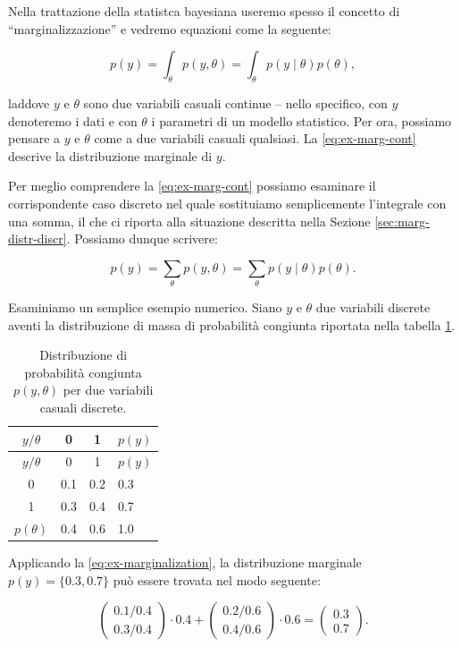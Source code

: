 \documentclass[
  11pt,
]{krantz}
\theoremstyle{definition}
\theoremstyle{definition}
\theoremstyle{definition}
\theoremstyle{definition}
\theoremstyle{remark}
\begin{document}
Nella trattazione della statistca bayesiana useremo spesso il concetto di ``marginalizzazione'' e vedremo equazioni come la seguente:

\begin{equation}
p(y) = \int_{\theta} p(y, \theta) = \int_{\theta} p(y \mid \theta) p(\theta),
\label{eq:ex-marg-cont}
\end{equation}

laddove \(y\) e \(\theta\) sono due variabili casuali continue -- nello specifico, con \(y\) denoteremo i dati e con \(\theta\) i parametri di un modello statistico. Per ora, possiamo pensare a \(y\) e \(\theta\) come a due variabili casuali qualsiasi. La \eqref{eq:ex-marg-cont} descrive la distribuzione marginale di \(y\).

Per meglio comprendere la \eqref{eq:ex-marg-cont} possiamo esaminare il corrispondente caso discreto nel quale sostituiamo semplicemente l'integrale con una somma, il che ci riporta alla situazione descritta nella Sezione \ref{sec:marg-distr-discr}. Possiamo dunque scrivere:

\begin{equation}
p(y) = \sum_{\theta} p(y, \theta) = \sum_{\theta} p(y \mid \theta) p(\theta).
\label{eq:ex-marginalization}
\end{equation}

Esaminiamo un semplice esempio numerico. Siano \(y\) e \(\theta\) due variabili discrete aventi la distribuzione di massa di probabilità congiunta riportata nella tabella \ref{tab:ex-marg}.

\begin{longtable}[]{@{}cccl@{}}
\caption{\label{tab:ex-marg} Distribuzione di probabilità congiunta \(p(y, \theta)\) per due variabili casuali discrete.}\tabularnewline
\toprule
\(y / \theta\) & 0 & 1 & \(p(y)\) \\
\midrule
\endfirsthead
\toprule
\(y / \theta\) & 0 & 1 & \(p(y)\) \\
\midrule
\endhead
0 & 0.1 & 0.2 & 0.3 \\
1 & 0.3 & 0.4 & 0.7 \\
\(p(\theta)\) & 0.4 & 0.6 & 1.0 \\
\bottomrule
\end{longtable}

Applicando la \eqref{eq:ex-marginalization}, la distribuzione marginale \(p(y) = \{0.3, 0.7\}\) può essere trovata nel modo seguente:

\[
\begin{pmatrix}
    0.1 / 0.4 \\
    0.3 / 0.4
\end{pmatrix} \cdot 0.4 +
\begin{pmatrix}
    0.2 / 0.6 \\
    0.4 / 0.6
\end{pmatrix} \cdot 0.6 =
\begin{pmatrix}
    0.3 \\
   0.7
\end{pmatrix}.
\]
\end{document}
